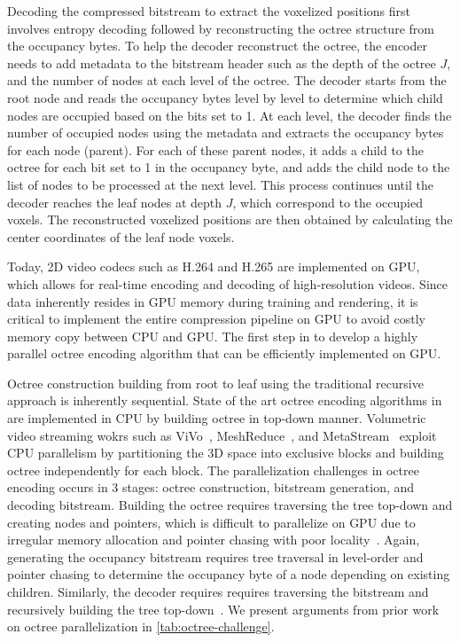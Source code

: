 Decoding the compressed bitstream to extract the voxelized positions first involves entropy decoding followed by reconstructing the octree structure from the occupancy bytes.
%
To help the decoder reconstruct the octree, the encoder needs to add metadata to the bitstream header such as the depth of the octree $J$, and the number of nodes at each level of the octree.
%
The decoder starts from the root node and reads the occupancy bytes level by level to determine which child nodes are occupied based on the bits set to 1.
%
At each level, the decoder finds the number of occupied nodes using the metadata and extracts the occupancy bytes for each node (parent). 
%
For each of these parent nodes, it adds a child to the octree for each bit set to 1 in the occupancy byte, and adds the child node to the list of nodes to be processed at the next level.
%
This process continues until the decoder reaches the leaf nodes at depth $J$, which correspond to the occupied voxels.
%
The reconstructed voxelized positions are then obtained by calculating the center coordinates of the leaf node voxels.

%
Today, 2D video codecs such as H.264 and H.265 are implemented on GPU, which allows for real-time encoding and decoding of high-resolution videos.
%
Since \gs data inherently resides in GPU memory during training and rendering, it is critical to implement the entire compression pipeline on GPU to avoid costly memory copy between CPU and GPU.
%
The first step in to develop a highly parallel octree encoding algorithm that can be efficiently implemented on GPU.

%
Octree construction building from root to leaf using the traditional recursive approach is inherently sequential.
%
State of the art octree encoding algorithms in ~\cite{gpcc,draco,pcl} are implemented in CPU by building octree in top-down manner.
%
Volumetric video streaming wokrs such as ViVo~\cite{vivo}, MeshReduce~\cite{meshreduce}, and MetaStream~\cite{metastream} exploit CPU parallelism by partitioning the 3D space into exclusive blocks and building octree independently for each block.
%
The parallelization challenges in octree encoding occurs in 3 stages: octree construction, bitstream generation, and decoding bitstream.
%
Building the octree requires traversing the tree top-down and creating nodes and pointers, which is difficult to parallelize on GPU due to irregular memory allocation and pointer chasing with poor locality~\cite{octree-gpu2011,octree-cpu2020,groot}.
%
Again, generating the occupancy bitstream requires tree traversal in level-order and pointer chasing to determine the occupancy byte of a node depending on existing children.
%
Similarly, the decoder requires requires traversing the bitstream and recursively building the tree top-down~\cite{octree-cpu2020,groot}.
%
We present arguments from prior work on octree parallelization in \cref{tab:octree-challenge}.

